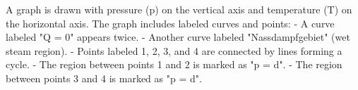 A graph is drawn with pressure (p) on the vertical axis and temperature (T) on the horizontal axis. The graph includes labeled curves and points:  
- A curve labeled "Q = 0" appears twice.  
- Another curve labeled "Nassdampfgebiet" (wet steam region).  
- Points labeled 1, 2, 3, and 4 are connected by lines forming a cycle.  
- The region between points 1 and 2 is marked as "p = d".  
- The region between points 3 and 4 is marked as "p = d".